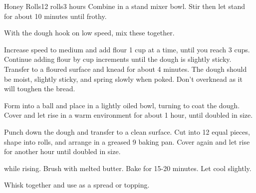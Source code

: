 \documentclass[../Cookbook.tex]{subfiles}
\begin{document}
\begin{recipe}[HoneyRolls]{Honey Rolls}{12 rolls}{3 hours}
Combine in a stand mixer bowl.
Stir then let stand for about 10 minutes until frothy.

With the dough hook on low speed, mix these together.

Increase speed to medium and add flour 1 cup at a time, until you reach 3 cups.
Continue adding flour by  cup increments until the dough is slightly sticky.
Transfer to a floured surface and knead for about 4 minutes.
The dough should be moist, slightly sticky, and spring slowly when poked.
Don't overknead as it will toughen the bread.

Form into a ball and place in a lightly oiled bowl, turning to coat the dough.
Cover and let rise in a warm environment for about 1 hour, until doubled in size.

Punch down the dough and transfer to a clean surface.
Cut into 12 equal pieces, shape into rolls, and arrange in a greased 9 baking pan.
Cover again and let rise for another hour until doubled in size.

 while rising.
Brush with melted butter.
Bake for 15-20 minutes.
Let cool slightly.

Whisk together and use as a spread or topping.
\end{recipe}
\end{document}
